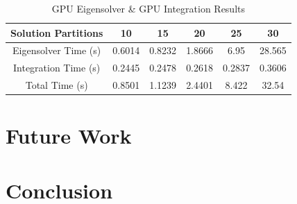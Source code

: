 \documentclass[conference, twoside]{IEEEtran}
\begin{document}
\begin{table}
    \renewcommand{\arraystretch}{1.3} %
    \caption{GPU Eigensolver \& GPU Integration Results}
    \label{gpu-eigensolver-and-integration-results}
    \centering
    \begin{tabular}{c||c|c|c|c|c}
        \hline
        {Solution Partitions} & {10} & {15} & {20} & {25} & {30} \\
        \hline
        \hline
        {Eigensolver Time (s)}              & {0.6014} & {0.8232} & {1.8666} & {6.95}   & {28.565}\\
        {Integration Time (s)}              & {0.2445} & {0.2478} & {0.2618} & {0.2837} & {0.3606}\\
        {Total Time (s)}                    & {0.8501} & {1.1239} & {2.4401} & {8.422}  & {32.54} \\
        \hline
    \end{tabular}
\end{table}

\section{Future Work}

\section{Conclusion}



\end{document}
